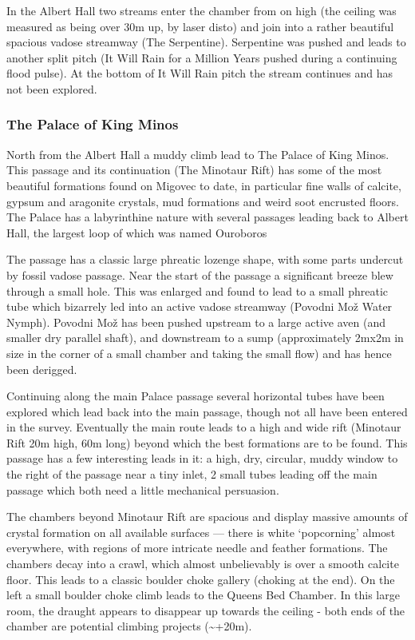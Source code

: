 \documentclass[english,a4]{article}
\begin{document}
In the Albert Hall two streams enter the chamber from on high (the
ceiling was measured as being over 30m up, by laser disto) and join
into a rather beautiful spacious vadose streamway (The Serpentine).
Serpentine was pushed and leads to another split pitch (It Will Rain
for a Million Years \textemdash{} pushed during a continuing flood
pulse). At the bottom of It Will Rain pitch the stream continues and
has not been explored.

\subsubsection{The Palace of King Minos}

North from the Albert Hall a muddy climb lead to The Palace of King
Minos. This passage and its continuation (The Minotaur Rift) has some
of the most beautiful formations found on Migovec to date, in particular
fine walls of calcite, gypsum and aragonite crystals, mud formations
and weird soot encrusted floors. The Palace has a labyrinthine nature
with several passages leading back to Albert Hall, the largest loop
of which was named Ouroboros

The passage has a classic large phreatic lozenge shape, with some
parts undercut by fossil vadose passage. Near the start of the passage
a significant breeze blew through a small hole. This was enlarged
and found to lead to a small phreatic tube which bizarrely led into
an active vadose streamway (Povodni Mo\v{z} \textemdash{} Water Nymph).
Povodni Mo\v{z} has been pushed upstream to a large active aven (and smaller
dry parallel shaft), and downstream to a sump (approximately 2mx2m
in size in the corner of a small chamber and taking the small flow)
and has hence been derigged.

Continuing along the main Palace passage several horizontal tubes
have been explored which lead back into the main passage, though not
all have been entered in the survey. Eventually the main route leads
to a high and wide rift (Minotaur Rift \textemdash{} 20m high, 60m
long) beyond which the best formations are to be found. This passage
has a few interesting leads in it: a high, dry, circular, muddy window
to the right of the passage near a tiny inlet, 2 small tubes leading
off the main passage which both need a little mechanical persuasion.

The chambers beyond Minotaur Rift are spacious and display massive
amounts of crystal formation on all available surfaces --- there is
white `popcorning' almost everywhere, with regions of more intricate
needle and feather formations. The chambers decay into a crawl, which
almost unbelievably is over a smooth calcite floor. This leads to
a classic boulder choke gallery (choking at the end). On the left
a small boulder choke climb leads to the Queens Bed Chamber. In this
large room, the draught appears to disappear up towards the ceiling
- both ends of the chamber are potential climbing projects (\textasciitilde{}+20m).
\end{document}
